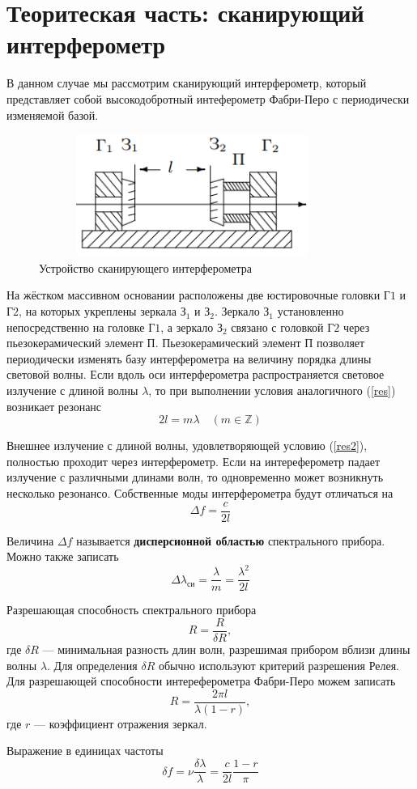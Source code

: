 \documentclass[12pt]{article}
\begin{document}
\section*{Теоритеская часть: сканирующий интерферометр}
\par
	В данном случае мы рассмотрим сканирующий интерферометр, который представляет собой высокодобротный интеферометр Фабри-Перо с периодически изменяемой базой.
\begin{figure}[h!]
	\centering
	\includegraphics[width = 10cm, height = 4cm]{image2.png}
	\caption{Устройство сканирующего интерферометра}
\end{figure}
\par
	На жёстком массивном основании расположены две юстировочные головки $\text{Г1}$ и $\text{Г2}$, на которых укреплены зеркала $\text{З}_1$ и $\text{З}_2$. Зеркало $\text{З}_1$ установленно непосредственно на головке $\text{Г1}$, а зеркало $\text{З}_2$ связано с головкой $\text{Г2}$ через пьезокерамический элемент $\text{П}$. Пьезокерамический элемент П позволяет периодически изменять базу интерферометра на величину порядка длины световой волны. Если вдоль оси интерферометра распространяется световое излучение с длиной волны $\lambda$, то при выполнении условия аналогичного (\ref{res}) возникает резонанс
\begin{equation}
	2 l = m \lambda \quad (m \in \mathbb{Z}) \label{res2}
\end{equation}
\par
	Внешнее излучение с длиной волны, удовлетворяющей условию (\ref{res2}), полностью проходит через интерферометр. Если на интереферометр падает излучение с различными длинами волн, то одновременно может возникнуть несколько резонансо. Собственные моды интерферометра будут отличаться на
\[
	\Delta f = \frac{c}{2l}
\]
\par
	Величина $\Delta f$ называется {\bf дисперсионной областью} спектрального прибора. Можно также записать
\begin{equation}
	\Delta \lambda_\text{си} = \frac{\lambda}{m} = \frac{\lambda^2}{2l} \label{S}
\end{equation}
\par
	Разрешающая способность спектрального прибора
\[
	R = \frac{R}{\delta R},
\]
где $\delta R$ --- минимальная разность длин волн, разрешимая прибором вблизи длины волны $\lambda$. Для определения $\delta R$ обычно используют критерий разрешения Релея. Для разрешающей способности интереферометра Фабри-Перо можем записать
\begin{equation}
	R = \frac{2 \pi l}{\lambda \left(1 - r \right)}, \label{Re}
\end{equation}
где $r$ --- коэффициент отражения зеркал.
\par
	Выражение в единицах частоты
\[	
	\delta f = \nu \frac{\delta \lambda}{\lambda} = \frac{c}{2l} \frac{1-r}{\pi}
\]
\end{document}

